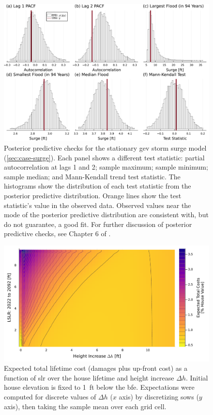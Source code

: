 \documentclass[ef,draft]{agutexSI2019}
\begin{document}
\begin{figure}
      \centering
      \includegraphics[width=\textwidth]{surge-test-statistics}
      \caption{
            Posterior predictive checks for the stationary \gls{gev} storm surge model (\cref{sec:case-surge}).
            Each panel shows a different test statistic: partial autocorrelation at lags 1 and 2; sample maximum; sample minimum; sample median; and Mann-Kendall trend test statistic.
            The histograms show the distribution of each test statistic from the posterior predictive distribution.
            Orange lines show the test statistic's value in the observed data.
            Observed values near the mode of the posterior predictive distribution are consistent with, but do not guarantee, a good fit.
            For further discussion of posterior predictive checks, see Chapter 6 of .
      }\label{fig:surge-test-statistics}
\end{figure}

\begin{figure}
      \includegraphics[width=\textwidth]{scenario-map-height-slr}
      \caption{
            Expected total lifetime cost (damages plus up-front cost) as a function of \gls{slr} over the house lifetime and height increase $\Delta h$.
            Initial house elevation is fixed to \SI{1}{ft} below the \gls{bfe}.
            Expectations were computed for discrete values of $\Delta h$ ($x$ axis) by discretizing \glspl{sow} ($y$ axis), then taking the sample mean over each grid cell.
      }\label{fig:scenario-map-height-slr}
\end{figure}
\end{document}
